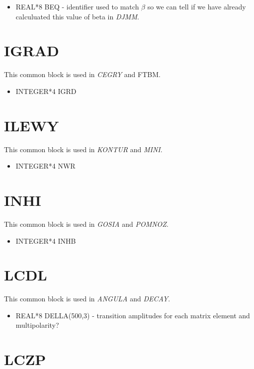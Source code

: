 \begin{itemize}
\item REAL*8 BEQ - identifier used to match $\beta$ so we can tell if we
have already calculuated this value of beta in {\em DJMM}.
\end{itemize}

\section{IGRAD}

This common block is used in {\em CEGRY} and {FTBM}.

\begin{itemize}
\item INTEGER*4 IGRD
\end{itemize}

\section{ILEWY}

This common block is used in {\em KONTUR} and {\em MINI}.

\begin{itemize}
\item INTEGER*4 NWR
\end{itemize}

\section{INHI}

This common block is used in {\em GOSIA} and {\em POMNOZ}.

\begin{itemize}
\item INTEGER*4 INHB
\end{itemize}


\section{LCDL}

This common block is used in {\em ANGULA} and {\em DECAY}.

\begin{itemize}
\item REAL*8 DELLA(500,3) - transition amplitudes for each matrix element
and multipolarity?
\end{itemize}

\section{LCZP}

